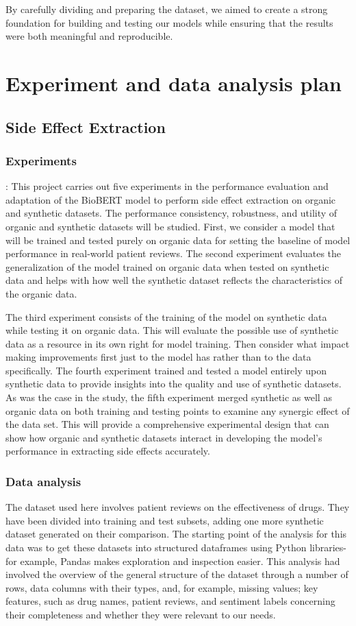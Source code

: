 \documentclass[sigplan,screen]{acmart}
\begin{document}
By carefully dividing and preparing the dataset, we aimed to create a strong foundation for building and testing our models while ensuring that the results were both meaningful and reproducible.



\section{Experiment and data analysis plan}
\subsection{Side Effect Extraction}
\subsubsection{Experiments}:
This project carries out five experiments in the performance evaluation and adaptation of the BioBERT model to perform side effect extraction on organic and synthetic datasets. The performance consistency, robustness, and utility of organic and synthetic datasets will be studied. First, we consider a model that will be trained and tested purely on organic data for setting the baseline of model performance in real-world patient reviews. The second experiment evaluates the generalization of the model trained on organic data when tested on synthetic data and helps with how well the synthetic dataset reflects the characteristics of the organic data.

The third experiment consists of the training of the model on synthetic data while testing it on organic data. This will evaluate the possible use of synthetic data as a resource in its own right for model training. Then consider what impact making improvements first just to the model has rather than to the data specifically. The fourth experiment trained and tested a model entirely upon synthetic data to provide insights into the quality and use of synthetic datasets. As was the case in the study, the fifth experiment merged synthetic as well as organic data on both training and testing points to examine any synergic effect of the data set. This will provide a comprehensive experimental design that can show how organic and synthetic datasets interact in developing the model's performance in extracting side effects accurately.

\subsubsection{Data analysis}
The dataset used here involves patient reviews on the effectiveness of drugs. They have been divided into training and test subsets, adding one more synthetic dataset generated on their comparison. The starting point of the analysis for this data was to get these datasets into structured dataframes using Python libraries-for example, Pandas makes exploration and inspection easier. This analysis had involved the overview of the general structure of the dataset through a number of rows, data columns with their types, and, for example, missing values; key features, such as drug names, patient reviews, and sentiment labels concerning their completeness and whether they were relevant to our needs.
\end{document}
